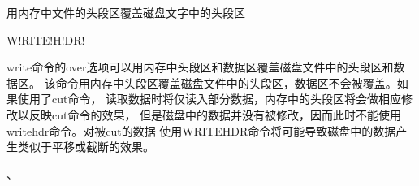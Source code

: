 \label{cmd:writehdr}

用内存中文件的头段区覆盖磁盘文字中的头段区

\begin{SACSTX}
W!RITE!H!DR!
\end{SACSTX}

write命令的over选项可以用内存中头段区和数据区覆盖磁盘文件中的头段区和数据区。
该命令用内存中头段区覆盖磁盘文件中的头段区，数据区不会被覆盖。如果使用了cut命令，
读取数据时将仅读入部分数据，内存中的头段区将会做相应修改以反映cut命令的效果，
但是磁盘中的数据并没有被修改，因而此时不能使用writehdr命令。对被cut的数据
使用WRITEHDR命令将可能导致磁盘中的数据产生类似于平移或截断的效果。

、
